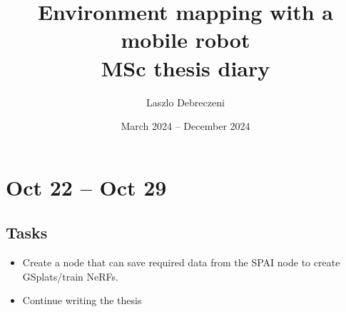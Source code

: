 \documentclass{article}
\title{Environment mapping with a mobile robot \\
\Large MSc thesis diary}
\author{Laszlo Debreczeni}
\date{March 2024 -- December 2024}
\begin{document}
\maketitle

\tableofcontents

\newpage

\section{Oct 22 -- Oct 29}
\subsection{Tasks}
\begin{itemize}
    \item Create a node that can save required data from the SPAI node to create GSplats/train NeRFs. 
    \item Continue writing the thesis 
\end{itemize}
\end{document}
